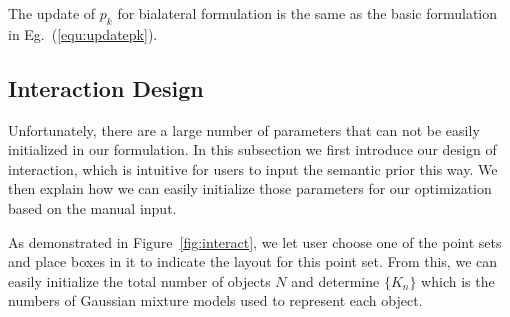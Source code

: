 The update of $p_k$ for bialateral  formulation is the same as the basic formulation in Eg.~(\ref{equ:updatepk}).



\subsection{Interaction Design}
\label{sec:imp:interact}
Unfortunately, there are a large number of parameters that can not be easily initialized in our formulation. 
%
In this subsection we first introduce our design of interaction, which is intuitive for users to input the semantic prior this way. We then explain how we can easily initialize those parameters for our optimization based on the manual input.


As demonstrated in Figure~\ref{fig:interact}, we let user choose one of the point sets and place boxes in it to indicate the layout for this point set. From this, we can easily initialize the total number of objects $N$ and determine $\{K_n\}$ which is the numbers of Gaussian mixture models used to represent each object.
